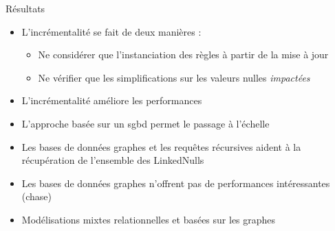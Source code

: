 \begin{frame}{Résultats}
    \begin{itemize}
        \item L'incrémentalité se fait de deux manières :
              \begin{itemize}
                  \item Ne considérer que l'instanciation des règles à partir de la mise à jour
                  \item Ne vérifier que les simplifications sur les valeurs nulles \emph{impactées}
              \end{itemize}
        \item L'incrémentalité améliore les performances
        \item L'approche basée sur un \gls{sgbd} permet le passage à l'échelle
        \item Les bases de données graphes et les requêtes récursives aident à la récupération de l'ensemble des LinkedNulls\vfill\vline\vfill
        \item Les bases de données graphes n'offrent pas de performances intéressantes (chase)
        \item Modélisations mixtes relationnelles et basées sur les graphes \cite{hassanGRFusionGraphsFirstClass2018}
    \end{itemize}
\end{frame}
